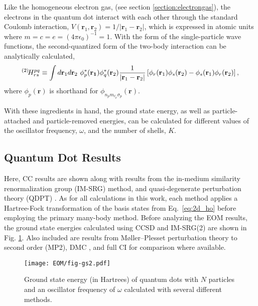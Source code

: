 \documentclass[thesis.tex]{subfiles}
\begin{document}
Like the homogeneous electron gas, (see section \ref{section:electrongas}), the electrons in the quantum dot interact with each other through the standard Coulomb interaction, $V\left( \mathbf{r}_{1}, \mathbf{r}_{2}\right) = 1/\lvert \mathbf{r}_{1} - \mathbf{r}_{2} \rvert$, which is expressed in atomic units where $m = c = e = (4\pi\epsilon_{0})^{-1} = 1$.  With the form of the single-particle wave functions, the second-quantized form of the two-body interaction can be analytically calculated,
\begin{equation} \label{eq:coloumb_integral}
  \Hint{2}{pq}{rs} \equiv \int d\mathbf{r}_{1} d\mathbf{r}_{2}\ \phi^{*}_{p}(\mathbf{r_{1}})\phi^{*}_{q}(\mathbf{r}_{2}) \frac{1}{\lvert \mathbf{r}_{1} - \mathbf{r}_{2} \rvert} \left[\phi_{r}(\mathbf{r}_{1})\phi_{s}(\mathbf{r}_{2}) - \phi_{s}(\mathbf{r}_{1})\phi_{r}(\mathbf{r}_{2})\right],
\end{equation}
where $\phi_{p}(\mathbf{r})$ is shorthand for $\phi_{n_{p} m_{\ell_{p}}\sigma_{p}}(\mathbf{r})$.

With these ingredients in hand, the ground state energy, as well as particle-attached and particle-removed energies, can be calculated for different values of the oscillator frequency, $\omega$, and the number of shells, $K$.

\subsection{Quantum Dot Results}

Here, CC results are shown along with results from the in-medium similarity renormalization group (IM-SRG) method, and quasi-degenerate perturbation theory (QDPT) \cite{LINDGREN1974}.  As for all calculations in this work, each method applies a Hartree-Fock transformation of the basis states from Eq.\ \eqref{eq:2d_ho} before employing the primary many-body method.  Before analyzing the EOM results, the ground state energies calculated using CCSD and IM-SRG(2) are shown in Fig. \ref{fig:QDground}.  Also included are results from M\o ller--Plesset perturbation theory to second order (MP2), DMC \cite{HOGBERGET2013}, and full CI \cite{OLSEN2013} for comparison where available.

\begin{figure}[h]
  \texttt{[image: EOM/fig-gs2.pdf]}
  \caption{Ground state energy (in Hartrees) of quantum dots with $N$ particles and an oscillator frequency of $\omega$ calculated with several different methods.}
  \label{fig:QDground}
\end{figure}
\end{document}
